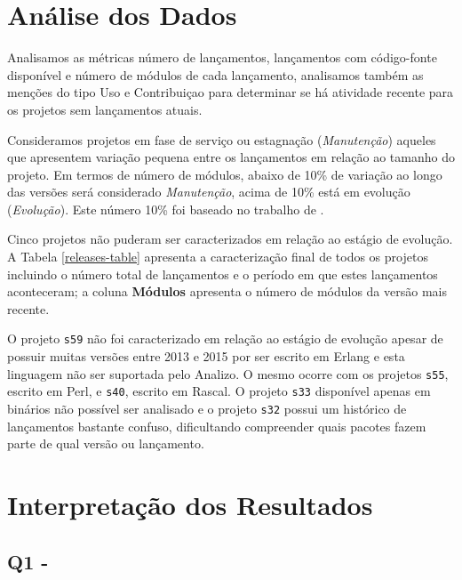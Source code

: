 
\section{Análise dos Dados} \label{estudo3:analise} %

Analisamos as métricas número de lançamentos, lançamentos com código-fonte disponível
e número de módulos de cada lançamento, 
analisamos também as
menções do tipo Uso e Contribuiçao para determinar se há atividade recente para
os projetos sem lançamentos atuais.

Consideramos projetos em fase de serviço ou estagnação ({\it Manutenção}) aqueles que
apresentem variação pequena entre os lançamentos em relação ao tamanho do
projeto. Em termos de número de módulos, abaixo de 10\% de variação ao longo
das versões será considerado {\it Manutenção}, acima de 10\% está em evolução
({\it Evolução}). Este número 10\% foi baseado no trabalho de
.

Cinco projetos não puderam ser caracterizados em relação ao estágio de
evolução. A Tabela \ref{releases-table} apresenta a caracterização final de
todos os projetos incluindo o número total de lançamentos e o período em que
estes lançamentos aconteceram; a coluna {\bf Módulos} apresenta o número de
módulos da versão mais recente.



O projeto \texttt{s59} não foi caracterizado em relação ao estágio de evolução
apesar de possuir muitas versões entre 2013 e 2015 por ser escrito em Erlang e
esta linguagem não ser suportada pelo Analizo. O mesmo ocorre com os projetos
\texttt{s55}, escrito em Perl, e \texttt{s40}, escrito em Rascal. O projeto
\texttt{s33} disponível apenas em binários não possível ser analisado e o
projeto \texttt{s32} possui um histórico de lançamentos bastante confuso,
dificultando compreender quais pacotes fazem parte de qual versão ou
lançamento.


\section{Interpretação dos Resultados} \label{estudo3:interpretacao} %

\subsection{Q1 - \EstudoTresQuestaoUm}

